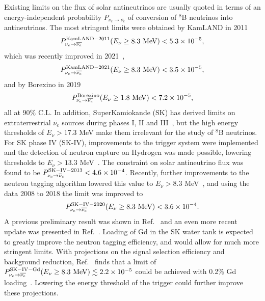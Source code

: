 \documentclass[
reprint,
superscriptaddress,
showpacs,
preprintnumbers,
nofootinbib,
nobibnotes,
amsmath,
amssymb, 
aps,
prd,
floatfix
]{revtex4-1}
\begin{document}
Existing limits on the flux of solar antineutrinos are usually quoted in terms of an energy-independent probability $P_{\nu_e \to \overline{\nu_e}}$ of conversion of $^8$B neutrinos into antineutrinos. The most stringent limits were obtained by KamLAND in 2011~\cite{Collaboration:2011jza}
\begin{equation}
    P^{\rm KamLAND-2011}_{\nu_e \to \overline{\nu_e}}(E_\nu \geq 8.3\,\, \text{MeV}) < 5.3 \times 10^{-5},
\end{equation}
which was recently improved in 2021~\cite{Abe:2021tkw},
\begin{equation}
    P^{\rm KamLAND-2021}_{\nu_e \to \overline{\nu_e}}(E_\nu \geq 8.3\,\, \text{MeV}) < 3.5 \times 10^{-5},
\end{equation}
and by Borexino in 2019~\cite{Agostini:2019yuq}
\begin{equation}
    P^{\rm Borexino}_{\nu_e \to \overline{\nu_e}} (E_\nu\geq1.8\,\, \text{MeV}) < 7.2\times10^{-5},
\end{equation}
all at $90 \%$ C.L. In addition, SuperKamiokande (SK) has derived limits on extraterrestrial $\overline{\nu_e}$ sources during phases I, II and III~\cite{Bays:2011si}, but the high energy thresholds of $E_\nu > 17.3$ MeV make them irrelevant for the study of $^8$B neutrinos. For SK phase IV (SK-IV), improvements to the trigger system were implemented and the detection of neutron capture on Hydrogen was made possible, lowering thresholds to $E_\nu > 13.3$ MeV~\cite{Zhang:2013tua}. The constraint on solar antineutrino flux was found to be $P^{\rm SK-IV-2013}_{\nu_e \to \overline{\nu}_e} < 4.6\times 10^{-4}$. Recently, further improvements to the neutron tagging algorithm lowered this value to $E_\nu > 8.3$ MeV~\cite{Super-Kamiokande:2020frs}, and using the data 2008 to 2018 the limit was improved to
\begin{equation}
    P^{\rm SK-IV-2020}_{\nu_e \to \overline{\nu_e}} (E_\nu\geq 8.3\,\, \text{MeV}) < 3.6\times10^{-4}.
\end{equation}
A previous preliminary result was shown in Ref.~\cite{Linyan2018} and an even more recent update was presented in Ref.~\cite{alberto_giampaolo_2021_4704606}. Loading of Gd in the SK water tank is expected to greatly improve the neutron tagging efficiency, and would allow for much more stringent limits. With projections on the signal selection efficiency and background reduction, Ref.~\cite{Super-Kamiokande:2020frs} finds that a limit of $P^{\rm SK-IV-Gd}_{\nu_e \to \overline{\nu_e}} (E_\nu\geq 8.3\,\, \text{MeV}) \lesssim 2.2\times10^{-5}$ could be achieved with 0.2\% Gd loading~\cite{Super-Kamiokande:2020frs}. Lowering the energy threshold of the trigger could further improve these projections.
\end{document}
